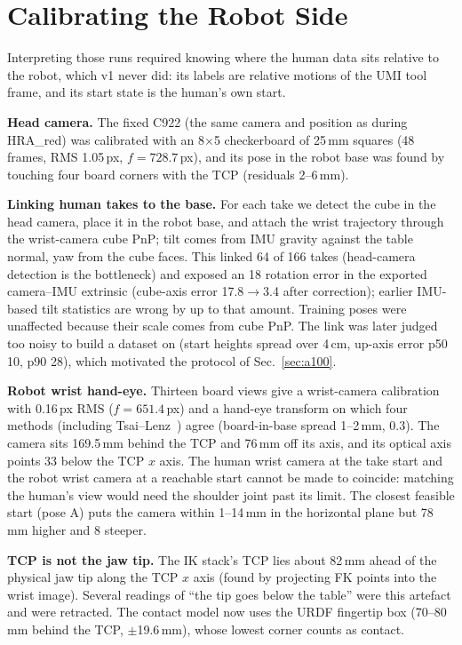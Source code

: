 \documentclass[conference,10pt]{IEEEtran}
\newcommand{\mm}{\,mm\xspace}
\begin{document}
\section{Calibrating the Robot Side}\label{sec:robotcal}
Interpreting those runs required knowing where the human data sits relative to the robot, which v1 never did: its labels are
relative motions of the UMI tool frame, and its start state is the human's own start.

\textbf{Head camera.} The fixed C922 (the same camera and position as during HRA\_red) was calibrated with an 8$\times$5
checkerboard of 25\mm squares (48 frames, RMS 1.05\,px, $f=728.7$\,px), and its pose in the robot base was found by touching
four board corners with the TCP (residuals 2--6\mm).

\textbf{Linking human takes to the base.} For each take we detect the cube in the head camera, place it in the robot base, and
attach the wrist trajectory through the wrist-camera cube PnP; tilt comes from IMU gravity against the table normal, yaw from
the cube faces. This linked 64 of 166 takes (head-camera detection is the bottleneck) and exposed an 18\textdegree{} rotation
error in the exported camera--IMU extrinsic (cube-axis error 17.8$\to$3.4\textdegree{} after correction); earlier IMU-based
tilt statistics are wrong by up to that amount. Training poses were unaffected because their scale comes from cube PnP. The
link was later judged too noisy to build a dataset on (start heights spread over 4\,cm, up-axis error p50 10\textdegree,
p90 28\textdegree), which motivated the protocol of Sec.~\ref{sec:a100}.

\textbf{Robot wrist hand-eye.} Thirteen board views give a wrist-camera calibration with 0.16\,px RMS ($f=651.4$\,px) and a
hand-eye transform on which four methods (including Tsai--Lenz~\cite{tsai1989handeye}) agree (board-in-base spread 1--2\mm, 0.3\textdegree). The camera sits 169.5\mm
behind the TCP and 76\mm off its axis, and its optical axis points 33\textdegree{} below the TCP $x$ axis. The human wrist
camera at the take start and the robot wrist camera at a reachable start cannot be made to coincide: matching the human's
view would need the shoulder joint past its limit. The closest feasible start (pose A) puts the camera within 1--14\mm in the
horizontal plane but 78\mm higher and 8\textdegree{} steeper.

\textbf{TCP is not the jaw tip.} The IK stack's TCP lies about 82\mm ahead of the physical jaw tip along the TCP $x$ axis
(found by projecting FK points into the wrist image). Several readings of ``the tip goes below the table'' were this artefact
and were retracted. The contact model now uses the URDF fingertip box (70--80\mm behind the TCP, $\pm$19.6\mm), whose lowest
corner counts as contact.
\end{document}
